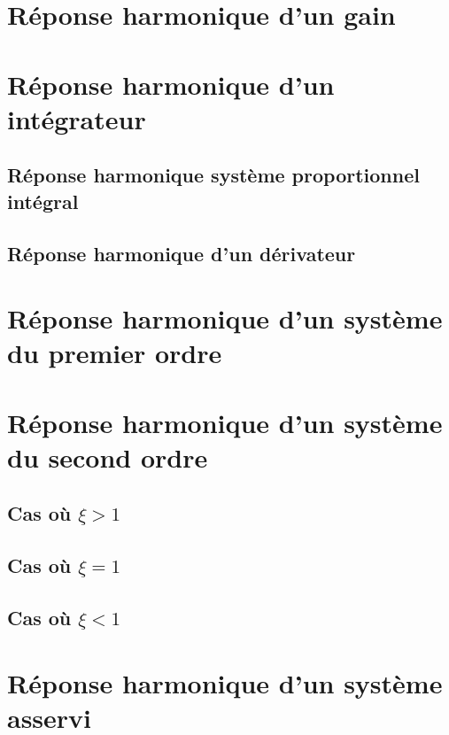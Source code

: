 \documentclass[10pt,oneside]{article}
\begin{document}
\section{Réponse harmonique d'un gain}



\section{Réponse harmonique d'un intégrateur}
\subsection{Réponse harmonique système proportionnel intégral}

\subsection{Réponse harmonique d'un dérivateur}

\section{Réponse harmonique d'un système du premier ordre}

\section{Réponse harmonique d'un système du second ordre}

\subsection{Cas où $\xi>1$}
\subsection{Cas où $\xi=1$}
\subsection{Cas où $\xi<1$}
\section{Réponse harmonique d'un système asservi}

\begin{thebibliography}{2}

\end{thebibliography}
\end{document}
